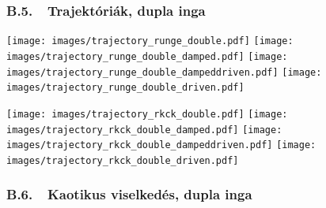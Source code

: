 \subsubsection*{B.5.\ \ Trajektóriák, dupla inga}

\begin{multicols}{4}

{\centering\texttt{[image: images/trajectory\_runge\_double.pdf]}}
\label{fig:88}
\hfill
{\centering\texttt{[image: images/trajectory\_runge\_double\_damped.pdf]}}
\label{fig:89}
\hfill
{\centering\texttt{[image: images/trajectory\_runge\_double\_dampeddriven.pdf]}}
\label{fig:90}
\hfill
{\centering\texttt{[image: images/trajectory\_runge\_double\_driven.pdf]}}
\label{fig:91}
\hfill

\end{multicols}

\begin{multicols}{4}

{\centering\texttt{[image: images/trajectory\_rkck\_double.pdf]}}
\label{fig:92}
\hfill
{\centering\texttt{[image: images/trajectory\_rkck\_double\_damped.pdf]}}
\label{fig:93}
\hfill
{\centering\texttt{[image: images/trajectory\_rkck\_double\_dampeddriven.pdf]}}
\label{fig:94}
\hfill
{\centering\texttt{[image: images/trajectory\_rkck\_double\_driven.pdf]}}
\label{fig:95}
\hfill

\end{multicols}

\newpage

\subsubsection*{B.6.\ \ Kaotikus viselkedés, dupla inga}

